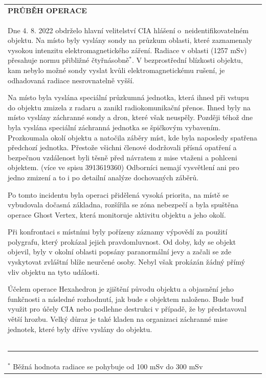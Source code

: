 \documentclass[a4paper, 11pt]{article}
\newlength{\fontheight}
\def\bottomrulewidth{0.3mm}		%
\def\tabtitleextraheight{5pt}	%
\def\tablestretch{1.4}			%
\newcommand{\blackcell}{\cellcolor{black} \color{white} \ttfamily \bfseries}
\newcommand{\tabtitle}[2]{\multicolumn{#1}{l}{\blackcell \MakeUppercase{#2}\rule{0pt}{\dimexpr \fontheight + 1pt + \tabtitleextraheight \relax} } \\ [\tabtitleextraheight]}
\newcommand{\ind}{\hspace*{8mm}}
\begin{document}
	\begin{table}[H]
		\renewcommand\tabularxcolumn[1]{m{#1}}
		\def\arraystretch{\tablestretch}
		\begin{tabularx}{\textwidth}{X}
			\tabtitle{1}{průběh operace}
		\ttfamily
		\ind Dne 4. 8. 2022 obdrželo hlavní velitelství CIA hlášení o~neidentifikovatelném objektu. Na místo byly vyslány sondy na průzkum oblasti, které zaznamenaly vysokou intenzitu elektromagnetického záření. Radiace v oblasti (1257 mSv) přesahuje normu přibližné čtyřnásobně$^*$. V bezprostřední blízkosti objektu, kam nebylo možné sondy vyslat kvůli elektromagnetickému rušení, je odhadovaná radiace nesrovnatelně vyšší.
		
		\ind Na místo byla vyslána speciální průzkumná jednotka, která ihned při vstupu do objektu zmizela z radaru a zanikl radiokomunikační přenos. Ihned byly na místo vyslány záchranné sondy a dron, které však neuspěly. Později téhož dne byla vyslána speciální záchranná jednotka se špičkovým vybavením. Prozkoumala okolí objektu a natočila záběry míst, kde byla naposledy spatřena předchozí jednotka. Přestože všichni členové dodržovali přísná opatření a bezpečnou vzdálenost byli těsně před návratem z mise vtaženi a pohlceni objektem. (více ve spisu 3913619360) Odborníci nemají vysvětlení ani pro jedno zmizení a to i po detailní analýze dochovaných záběrů.
		
		\ind Po tomto incidentu byla operaci přidělená vysoká priorita, na místě se vybudovala dočasná základna, rozšířila se zóna nebezpečí a byla spuštěna operace Ghost Vertex, která monitoruje aktivitu objektu a jeho okolí.
		
		\ind Při konfrontaci s místními byly pořízeny záznamy výpovědí za použití polygrafu, který prokázal jejich pravdomluvnost. Od doby, kdy se objekt objevil, byly v okolní oblasti popsány paranormální jevy a začali se zde vyskytovat zvláštní blíže neurčené osoby. Nebyl však prokázán žádný přímý vliv objektu na tyto události.
		
		\ind Účelem operace Hexahedron je zjištění původu objektu a objasnění jeho funkčnosti a následné rozhodnutí, jak bude s objektem naloženo. Bude buď využit pro účely CIA nebo podlehne destrukci v případě, že by představoval větší hrozbu. Velký důraz je také kladen na organizaci záchranné mise jednotek, které byly dříve vyslány do objektu.\\ \bottomrule[\bottomrulewidth]
		\rule{7cm}{0.1mm} \\[-1.5ex]
		\footnotesize $^*$ Běžná hodnota radiace se pohybuje od 100 mSv do 300 mSv \\
		\end{tabularx}
	\end{table}
	
\end{document}
